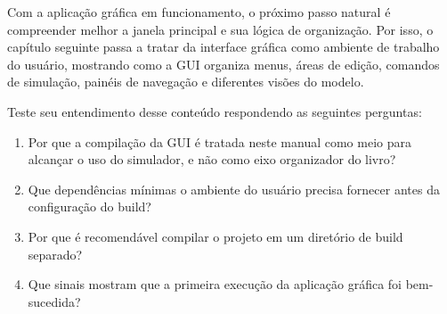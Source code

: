 Com a aplicação gráfica em funcionamento, o próximo passo natural é compreender melhor a janela principal e sua lógica de organização. Por isso, o capítulo seguinte passa a tratar da interface gráfica como ambiente de trabalho do usuário, mostrando como a GUI organiza menus, áreas de edição, comandos de simulação, painéis de navegação e diferentes visões do modelo.

Teste seu entendimento desse conteúdo respondendo as seguintes perguntas:

\begin{enumerate}
    \item Por que a compilação da GUI é tratada neste manual como meio para alcançar o uso do simulador, e não como eixo organizador do livro?

    \item Que dependências mínimas o ambiente do usuário precisa fornecer antes da configuração do build?

    \item Por que é recomendável compilar o projeto em um diretório de build separado?

    \item Que sinais mostram que a primeira execução da aplicação gráfica foi bem-sucedida?
\end{enumerate}
